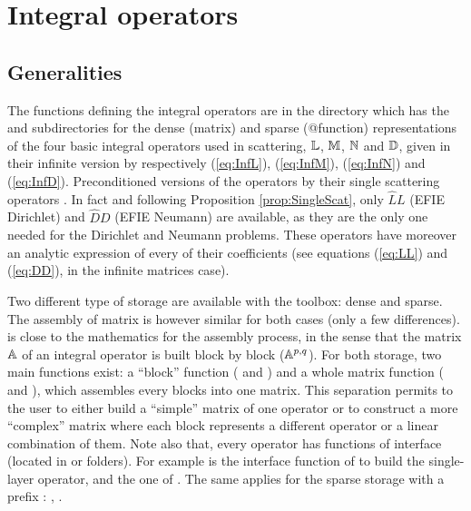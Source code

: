\section{Integral operators}

\subsection{Generalities}

The functions defining the integral operators are in the directory  which has the 
and  subdirectories for the dense (matrix) and sparse (@function) representations of the four basic integral operators used in scattering,
\ie ${\mathbb{L}}$, ${\mathbb{M}}$, ${\mathbb{N}}$ and ${\mathbb{D}}$, given in their infinite version by respectively (\ref{eq:InfL}), (\ref{eq:InfM}), (\ref{eq:InfN}) and (\ref{eq:InfD}). Preconditioned versions of the operators by their single scattering operators \cite{Thi14}. In fact and following Proposition \ref{prop:SingleScat}, only $\widehat{L}L$ (EFIE Dirichlet) and $\widehat{D}D$ (EFIE Neumann) are available, as they are the only one needed for the Dirichlet and Neumann problems. These operators have moreover an analytic expression of every of their coefficients (see equations (\ref{eq:LL}) and (\ref{eq:DD}), in the infinite matrices case).

Two different type of storage are available with the \mudiff toolbox: dense and sparse. The assembly of matrix is however similar for both cases (only a few differences). \mudiff is close to the mathematics for the assembly process, in the sense that the matrix ${\mathbb{A}}$ of an integral operator is built block by block ($\mathbb{A}^{p,q}$). For both storage, two main functions exist: a ``block'' function ( and ) and a whole matrix function ( and ), which assembles every blocks into one matrix. This separation permits to the user to either build a ``simple'' matrix of one operator or to construct a more ``complex'' matrix where each block represents a different operator or a linear combination of them. Note also that, every operator has functions of interface (located in  or  folders). For example  is the interface function of  to build the single-layer operator, and  the one of . The same applies for the sparse storage with a prefix :  ,  .



